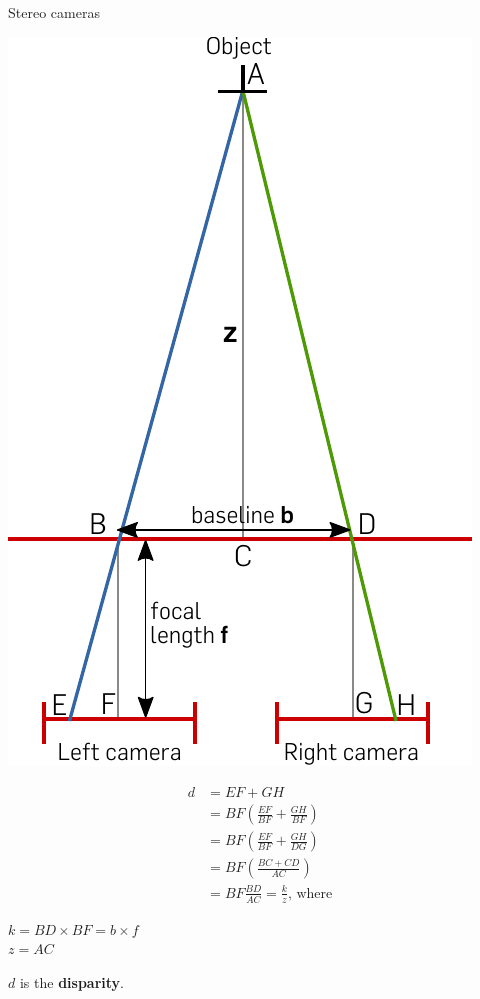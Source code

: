 \documentclass[compress]{beamer}
\begin{document}
\begin{frame}{Stereo cameras}
{\begin{multicols}{2}
    \begin{center}
        \includegraphics[height=0.8\paperheight]{stereo}
    \end{center}

    \begin{align} 
d &= EF + GH \\ 
    &= BF (\frac{EF}{BF} + \frac{GH}{BF})\\ 
    &= BF (\frac{EF}{BF} + \frac{GH}{DG})  \\ 
    &= BF (\frac{BC + CD}{AC})  \\ 
    &= BF \frac{BD}{AC} = \frac{k}{z}  \text{, where}
    \end{align}

        $k = BD \times BF = b \times f$\\
        $z = AC$

        $d$ is the \textbf{disparity}.
\end{multicols}

}
\end{frame}
\end{document}
